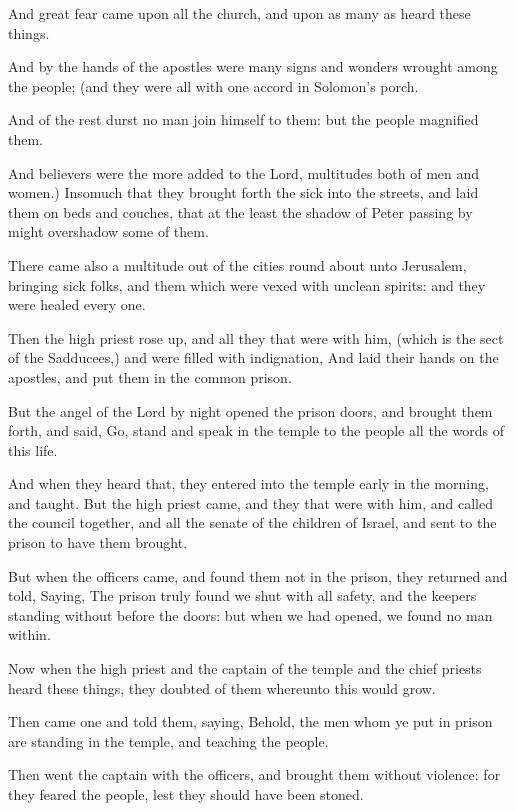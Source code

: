 \verse And great fear came upon all the church, and upon as many as heard these things.

\verse And by the hands of the apostles were many signs and wonders wrought among the people; (and they were all with one accord in Solomon's porch.

\verse And of the rest durst no man join himself to them: but the people magnified them.

\verse And believers were the more added to the Lord, multitudes both of men and women.)  \verse Insomuch that they brought forth the sick into the streets, and laid them on beds and couches, that at the least the shadow of Peter passing by might overshadow some of them.

\verse There came also a multitude out of the cities round about unto Jerusalem, bringing sick folks, and them which were vexed with unclean spirits: and they were healed every one.

\verse Then the high priest rose up, and all they that were with him, (which is the sect of the Sadducees,) and were filled with indignation, \verse And laid their hands on the apostles, and put them in the common prison.

\verse But the angel of the Lord by night opened the prison doors, and brought them forth, and said, \verse Go, stand and speak in the temple to the people all the words of this life.

\verse And when they heard that, they entered into the temple early in the morning, and taught. But the high priest came, and they that were with him, and called the council together, and all the senate of the children of Israel, and sent to the prison to have them brought.

\verse But when the officers came, and found them not in the prison, they returned and told, \verse Saying, The prison truly found we shut with all safety, and the keepers standing without before the doors: but when we had opened, we found no man within.

\verse Now when the high priest and the captain of the temple and the chief priests heard these things, they doubted of them whereunto this would grow.

\verse Then came one and told them, saying, Behold, the men whom ye put in prison are standing in the temple, and teaching the people.

\verse Then went the captain with the officers, and brought them without violence: for they feared the people, lest they should have been stoned.

